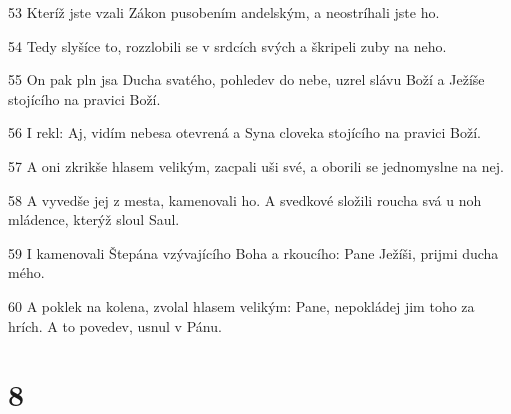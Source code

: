 \par 53 Kteríž jste vzali Zákon pusobením andelským, a neostríhali jste ho.
\par 54 Tedy slyšíce to, rozzlobili se v srdcích svých a škripeli zuby na neho.
\par 55 On pak pln jsa Ducha svatého, pohledev do nebe, uzrel slávu Boží a Ježíše stojícího na pravici Boží.
\par 56 I rekl: Aj, vidím nebesa otevrená a Syna cloveka stojícího na pravici Boží.
\par 57 A oni zkrikše hlasem velikým, zacpali uši své, a oborili se jednomyslne na nej.
\par 58 A vyvedše jej z mesta, kamenovali ho. A svedkové složili roucha svá u noh mládence, kterýž sloul Saul.
\par 59 I kamenovali Štepána vzývajícího Boha a rkoucího: Pane Ježíši, prijmi ducha mého.
\par 60 A poklek na kolena, zvolal hlasem velikým: Pane, nepokládej jim toho za hrích. A to povedev, usnul v Pánu.

\chapter{8}

